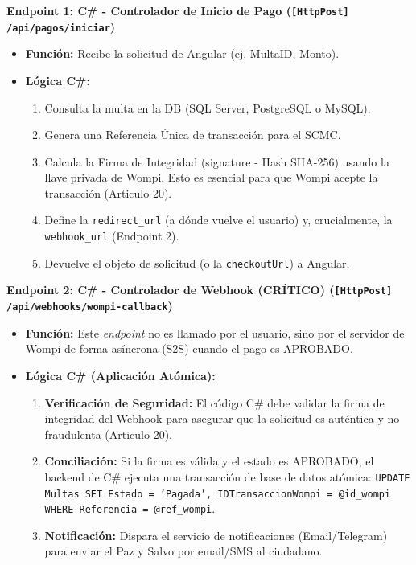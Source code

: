 \textbf{Endpoint 1: C\# - Controlador de Inicio de Pago (\texttt{[HttpPost] /api/pagos/iniciar})}
\begin{itemize}
    \item \textbf{Función:} Recibe la solicitud de Angular (ej. MultaID, Monto).
    \item \textbf{Lógica C\#:}
        \begin{enumerate}
            \item Consulta la multa en la DB (SQL Server, PostgreSQL o MySQL).
            \item Genera una Referencia Única de transacción para el SCMC.
            \item Calcula la Firma de Integridad (signature - Hash SHA-256) usando la llave privada de Wompi. Esto es esencial para que Wompi acepte la transacción (Articulo 20).
            \item Define la \texttt{redirect\_url} (a dónde vuelve el usuario) y, crucialmente, la \texttt{webhook\_url} (Endpoint 2).
            \item Devuelve el objeto de solicitud (o la \texttt{checkoutUrl}) a Angular.
        \end{enumerate}
\end{itemize}

\textbf{Endpoint 2: C\# - Controlador de Webhook (CRÍTICO) (\texttt{[HttpPost] /api/webhooks/wompi-callback})}
\begin{itemize}
    \item \textbf{Función:} Este \textit{endpoint} no es llamado por el usuario, sino por el servidor de Wompi de forma asíncrona (S2S) cuando el pago es APROBADO.
    \item \textbf{Lógica C\# (Aplicación Atómica):}
        \begin{enumerate}
            \item \textbf{Verificación de Seguridad:} El código C\# debe validar la firma de integridad del Webhook para asegurar que la solicitud es auténtica y no fraudulenta (Articulo 20).
            \item \textbf{Conciliación:} Si la firma es válida y el estado es APROBADO, el backend de C\# ejecuta una transacción de base de datos atómica: \texttt{UPDATE Multas SET Estado = 'Pagada', IDTransaccionWompi = @id\_wompi WHERE Referencia = @ref\_wompi}.
            \item \textbf{Notificación:} Dispara el servicio de notificaciones (Email/Telegram) para enviar el Paz y Salvo por email/SMS al ciudadano.
        \end{enumerate}
\end{itemize}